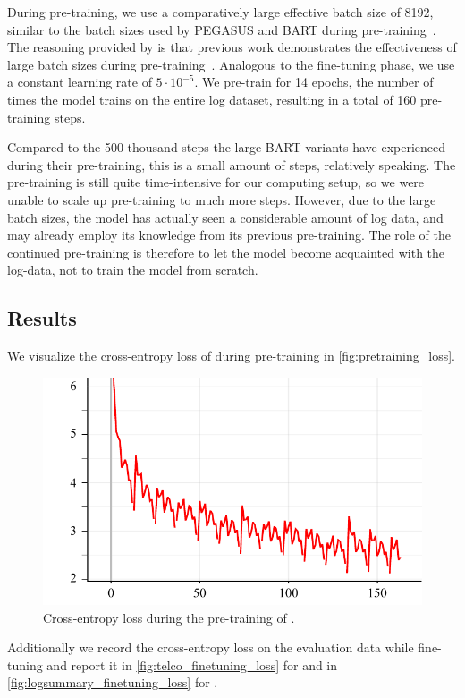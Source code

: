 During pre-training, we use a comparatively large effective batch size of 8192, similar to the batch sizes used by PEGASUS and BART during pre-training~\parencites{bart}{pegasus}.
The reasoning provided by \citeauthor*{bart} is that previous work demonstrates the effectiveness of large batch sizes during pre-training~\parencite[7875]{bart}.
Analogous to the fine-tuning phase, we use a constant learning rate of \(5 \cdot 10^{-5}\).
We pre-train for 14 epochs, the number of times the model trains on the entire log dataset, resulting in a total of 160 pre-training steps.

Compared to the 500 thousand steps the large BART variants have experienced during their pre-training,
this is a small amount of steps, relatively speaking.
The pre-training is still quite time-intensive for our computing setup, so we were unable to scale up pre-training to much more steps.
However, due to the large batch sizes, the model has actually seen a considerable amount of log data,
and may already employ its knowledge from its previous pre-training.
The role of the continued pre-training is therefore to let the model become acquainted with the log-data,
not to train the model from scratch.

\subsection{Results}

We visualize the cross-entropy loss of  during pre-training in \autoref{fig:pretraining_loss}.

\begin{figure}[htbp]
\centering
\includegraphics[width=.75\textwidth]{images/thesis/pretraining_loss}
\caption{Cross-entropy loss during the pre-training of .}
\label{fig:pretraining_loss}
\end{figure}

Additionally we record the cross-entropy loss on the evaluation data while fine-tuning
and report it in \autoref{fig:telco_finetuning_loss} for \telco{}
and in \autoref{fig:logsummary_finetuning_loss} for \logsummary{}.

